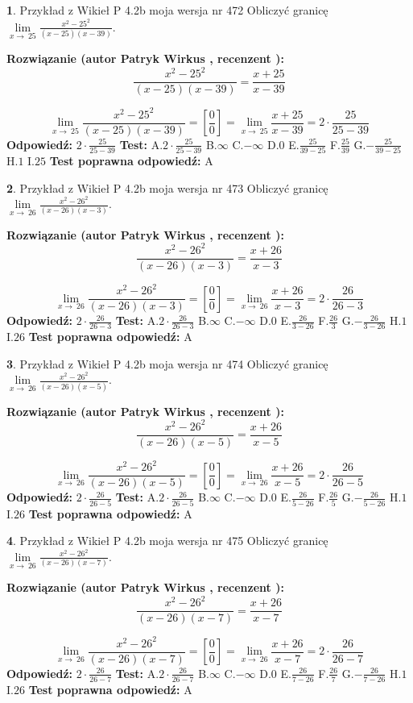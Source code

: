 \documentclass[12pt, a4paper]{article}
\theoremstyle{definition} %
\newtheorem{zad}{}
\newcommand{\zadStart}[1]{\begin{zad}#1\newline}
\newcommand{\zadStop}{\end{zad}}
\newcommand{\rozwStart}[2]{\noindent \textbf{Rozwiązanie (autor #1 , recenzent #2): }\newline}
\newcommand{\rozwStop}{\newline}
\newcommand{\odpStart}{\noindent \textbf{Odpowiedź:}\newline}
\newcommand{\odpStop}{\newline}
\newcommand{\testStart}{\noindent \textbf{Test:}\newline}
\newcommand{\testStop}{\newline}
\newcommand{\kluczStart}{\noindent \textbf{Test poprawna odpowiedź:}\newline}
\newcommand{\kluczStop}{\newline}
\begin{document}
\zadStart{Przykład z Wikieł P 4.2b moja wersja nr 472}
Obliczyć granicę $\lim\limits_{x\to\ 25}\frac{x^{2}-25^{2}}{(x-25)(x-39)}$.
\zadStop
\rozwStart{Patryk Wirkus}{}
$$\frac{x^{2}-25^{2}}{(x-25)(x-39)}=\frac{x+25}{x-39}$$

$$\lim\limits_{x\to\ 25}\frac{x^{2}-25^{2}}{(x-25)(x-39)}=[\frac{0}{0}]=\lim\limits_{x\to\ 25}\frac{x+25}{x-39}=2 \cdot \frac{25}{25-39}$$
\rozwStop
\odpStart
$2 \cdot \frac{25}{25-39}$
\odpStop
\testStart
A.$2 \cdot \frac{25}{25-39}$
B.$\infty$
C.$-\infty$
D.$0$
E.$\frac{25}{39-25}$
F.$\frac{25}{39}$
G.$-\frac{25}{39-25}$
H.$1$
I.$25$
\testStop
\kluczStart
A
\kluczStop



\zadStart{Przykład z Wikieł P 4.2b moja wersja nr 473}
Obliczyć granicę $\lim\limits_{x\to\ 26}\frac{x^{2}-26^{2}}{(x-26)(x-3)}$.
\zadStop
\rozwStart{Patryk Wirkus}{}
$$\frac{x^{2}-26^{2}}{(x-26)(x-3)}=\frac{x+26}{x-3}$$

$$\lim\limits_{x\to\ 26}\frac{x^{2}-26^{2}}{(x-26)(x-3)}=[\frac{0}{0}]=\lim\limits_{x\to\ 26}\frac{x+26}{x-3}=2 \cdot \frac{26}{26-3}$$
\rozwStop
\odpStart
$2 \cdot \frac{26}{26-3}$
\odpStop
\testStart
A.$2 \cdot \frac{26}{26-3}$
B.$\infty$
C.$-\infty$
D.$0$
E.$\frac{26}{3-26}$
F.$\frac{26}{3}$
G.$-\frac{26}{3-26}$
H.$1$
I.$26$
\testStop
\kluczStart
A
\kluczStop



\zadStart{Przykład z Wikieł P 4.2b moja wersja nr 474}
Obliczyć granicę $\lim\limits_{x\to\ 26}\frac{x^{2}-26^{2}}{(x-26)(x-5)}$.
\zadStop
\rozwStart{Patryk Wirkus}{}
$$\frac{x^{2}-26^{2}}{(x-26)(x-5)}=\frac{x+26}{x-5}$$

$$\lim\limits_{x\to\ 26}\frac{x^{2}-26^{2}}{(x-26)(x-5)}=[\frac{0}{0}]=\lim\limits_{x\to\ 26}\frac{x+26}{x-5}=2 \cdot \frac{26}{26-5}$$
\rozwStop
\odpStart
$2 \cdot \frac{26}{26-5}$
\odpStop
\testStart
A.$2 \cdot \frac{26}{26-5}$
B.$\infty$
C.$-\infty$
D.$0$
E.$\frac{26}{5-26}$
F.$\frac{26}{5}$
G.$-\frac{26}{5-26}$
H.$1$
I.$26$
\testStop
\kluczStart
A
\kluczStop



\zadStart{Przykład z Wikieł P 4.2b moja wersja nr 475}
Obliczyć granicę $\lim\limits_{x\to\ 26}\frac{x^{2}-26^{2}}{(x-26)(x-7)}$.
\zadStop
\rozwStart{Patryk Wirkus}{}
$$\frac{x^{2}-26^{2}}{(x-26)(x-7)}=\frac{x+26}{x-7}$$

$$\lim\limits_{x\to\ 26}\frac{x^{2}-26^{2}}{(x-26)(x-7)}=[\frac{0}{0}]=\lim\limits_{x\to\ 26}\frac{x+26}{x-7}=2 \cdot \frac{26}{26-7}$$
\rozwStop
\odpStart
$2 \cdot \frac{26}{26-7}$
\odpStop
\testStart
A.$2 \cdot \frac{26}{26-7}$
B.$\infty$
C.$-\infty$
D.$0$
E.$\frac{26}{7-26}$
F.$\frac{26}{7}$
G.$-\frac{26}{7-26}$
H.$1$
I.$26$
\testStop
\kluczStart
A
\kluczStop
\end{document}
